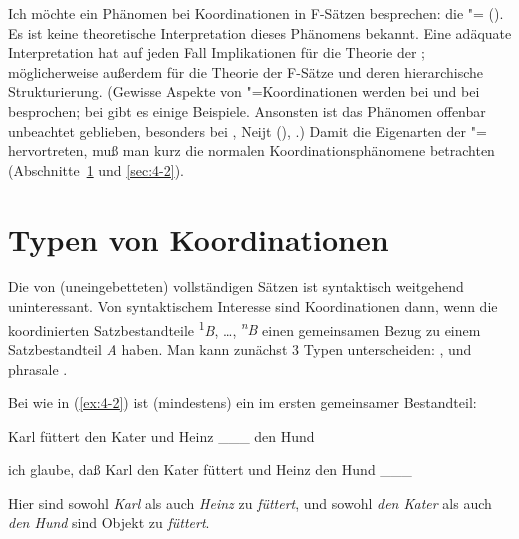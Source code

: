 \documentclass[output=paper]{langsci/langscibook}
\begin{document}
Ich möchte ein Phänomen bei Koordinationen in F-Sätzen besprechen: die "= (). Es ist keine theoretische Interpretation dieses Phänomens bekannt. Eine adäquate Interpretation hat auf jeden Fall Implikationen für die Theorie der ; möglicherweise außerdem für die Theorie der F-Sätze und deren hierarchische Strukturierung. (Gewisse Aspekte von "=Koordinationen werden bei \citet[61–67, 94f, 98f]{Kunze1972} und bei \citet[28f]{Hankamer1973} besprochen; bei \citet[§1192b]{Behaghel1928} gibt es einige Beispiele. Ansonsten ist das Phänomen offenbar unbeachtet geblieben, besonders bei \cite{Kohrt1976}, \mbox{Neijt} (\citeyear{Neijt1979}), \cite{Hankamer1979}.) Damit die Eigenarten der "= hervortreten, muß man kurz die normalen Koordinationsphänomene betrachten (Abschnitte~\ref{sec:4-1} und \ref{sec:4-2}).


\section{Typen von Koordinationen}%
\label{sec:4-1}

\addlines[2]
Die  von (uneingebetteten) vollständigen Sätzen ist syntaktisch weitgehend uninteressant. Von syntaktischem Interesse sind Koordinationen dann, wenn die koordinierten Satzbestandteile \textsuperscript{1}\textit{B}, \ldots, \textit{\textsuperscript{n}}\textit{B} einen gemeinsamen Bezug zu einem Satzbestandteil \textit{A} haben. Man kann zunächst 3 Typen unterscheiden: ,  und phrasale .

\ssubsection{}%
\label{subsec:4-1-1}
Bei  wie in (\ref{ex:4-2}) ist (mindestens) ein  im ersten  gemeinsamer Bestandteil:

\begin{exe}
\ex
\label{ex:4-2}
\begin{xlist}
\ex%
\label{ex:4-2a}
Karl füttert den Kater und Heinz \_\_\_ den Hund

\ex%
\label{ex:4-2b}
ich glaube, daß Karl den Kater füttert und Heinz den Hund \_\_\_ 
\end{xlist}
\end{exe}
Hier sind sowohl \textit{Karl} als auch \textit{Heinz}  zu \textit{füttert}, und sowohl \textit{den Kater} als auch \textit{den Hund} sind Objekt zu \textit{füttert}.
\end{document}
